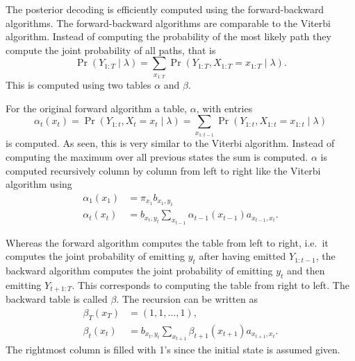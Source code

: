 The posterior decoding is efficiently computed using the for\-ward\--back\-ward
algorithms. The forward-backward algorithms are comparable to the Viterbi
algorithm. Instead of computing the probability of the most likely path they
compute the joint probability of all paths, that is
\begin{equation*}
  \Pr
  \left(
    Y_{1:T} \mid \lambda
  \right) = \sum_{x_{1:T}} \Pr
  \left(
    Y_{1:T}, X_{1:T} = x_{1:T} \mid \lambda
  \right).
\end{equation*}
This is computed using two tables $\alpha$ and $\beta$.

For the original forward algorithm a table, $\alpha$, with entries
\begin{equation*}
\alpha_t(x_t) = \Pr \left( Y_{1:t}, X_t = x_t \mid \lambda \right) =
\sum_{x_{1:t-1}} \Pr \left( Y_{1:t}, X_{1:t} = x_{1:t} \mid \lambda \right)
\end{equation*}
is computed. As seen, this is very similar to the Viterbi algorithm. Instead of
computing the maximum over all previous states the sum is computed. $\alpha$ is
computed recursively column by column from left to right like the Viterbi
algorithm using
\begin{equation}
  \label{eq:8}
  \begin{aligned}
    \alpha_1(x_1) &= \pi_{x_1} b_{x_1, y_1} \\
    \alpha_t(x_t) &= b_{x_t, y_t} \sum_{x_{t - 1}} \alpha_{t - 1}(x_{t - 1})
    a_{x_{t - 1}, x_t}.
  \end{aligned}
\end{equation}

Whereas the forward algorithm computes the table from left to right, i.e.\
it computes the joint probability of emitting $y_t$ after having emitted
$Y_{1:t-1}$, the backward algorithm computes the joint probability of emitting
$y_t$ and then emitting $Y_{t+1:T}$. This corresponds to computing the table from
right to left. The backward table is called $\beta$. The recursion can be written as
\begin{equation}
  \label{eq:9}
  \begin{aligned}
    \beta_T(x_T) &= (1, 1, \dots, 1), \\
    \beta_t(x_t) &= b_{x_t, y_t} \sum_{x_{t + 1}} \beta_{t + 1}(x_{t + 1})
    a_{x_{t + 1}, x_t}.
  \end{aligned}
\end{equation}
The rightmost column is filled with 1's since the initial state is assumed
given.

